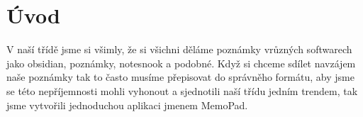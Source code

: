 \section{Úvod}
V naší třídě jsme si všimly, že si všichni děláme poznámky vrůzných softwarech jako obsidian, poznámky, notesnook a podobné. Když si chceme sdílet navzájem naše poznámky tak to často musíme přepisovat do správněho formátu, aby jsme se této nepříjemnosti mohli vyhonout a sjednotili naší třídu jedním trendem, tak jsme vytvořili jednoduchou aplikaci jmenem MemoPad.
